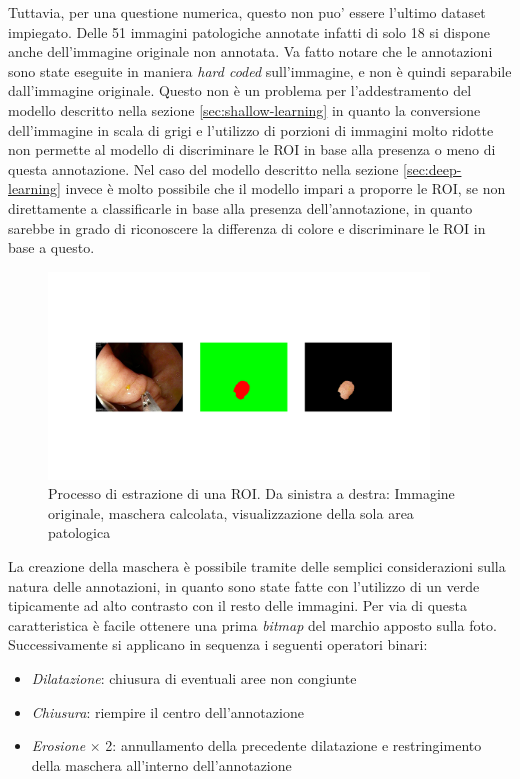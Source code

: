 Tuttavia, per una questione numerica, questo non puo' essere
l'ultimo dataset impiegato.
Delle 51 immagini patologiche annotate infatti di solo 
18 si dispone anche dell'immagine originale non annotata.
Va fatto notare che le annotazioni sono state eseguite in maniera
{\it hard coded} sull'immagine, e non è quindi separabile dall'immagine
originale.
Questo non è un problema per l'addestramento del modello descritto
nella sezione \ref{sec:shallow-learning} in quanto la conversione
dell'immagine in scala di grigi e l'utilizzo di porzioni di immagini
molto ridotte non permette al modello di discriminare le ROI
in base alla presenza o meno di questa annotazione.
Nel caso del modello descritto nella sezione \ref{sec:deep-learning}
invece è molto possibile che il modello impari a proporre le ROI,
se non direttamente a classificarle in base alla presenza
dell'annotazione, in quanto sarebbe in grado di riconoscere
la differenza di colore e discriminare le ROI in base a questo.

\begin{figure}[h]
    \center
    \includegraphics[width=0.9\textwidth,trim=5.0cm 5cm 6cm 6.0cm,clip]{./assets/cutout.png}
    \caption{\label{fig:cutout}Processo di estrazione di una ROI. Da sinistra a destra:
    Immagine originale, maschera calcolata, visualizzazione della sola area patologica
    }
\end{figure}

La creazione della maschera è possibile tramite delle semplici
considerazioni sulla natura delle annotazioni, in quanto sono
state fatte con l'utilizzo di un verde tipicamente ad alto
contrasto con il resto delle immagini.
Per via di questa caratteristica è facile ottenere una prima
{\it bitmap} del marchio apposto sulla foto.
Successivamente si applicano in sequenza i seguenti operatori
binari:

\begin{itemize}
    \item {\it Dilatazione}: chiusura di eventuali aree non congiunte
    \item {\it Chiusura}: riempire il centro dell'annotazione
    \item {\it Erosione} $\times$ 2: annullamento della precedente dilatazione
    e restringimento della maschera all'interno dell'annotazione
\end{itemize}

